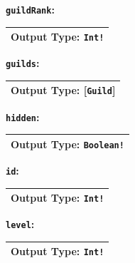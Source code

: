 \documentclass[10pt, a4paper]{memoir}
\numberwithin{equation}{section}
\theoremstyle{plain}
\theoremstyle{defp}
\theoremstyle{dotless}
\theoremstyle{definition}
\theoremstyle{dotless}
\theoremstyle{dotless}
\theoremstyle{defp}
\theoremstyle{defp}
\theoremstyle{be}          %
\theoremstyle{defp}
\newcommand\ttt[1]{\texttt{#1}}
\begin{document}
\medskip

\textbf{\ttt{guildRank}:}

\begin{table}[h]
	\centering
	\begin{tabular}{ |p{3cm}|p{3cm}|p{3cm}|  }
		\hline
		\multicolumn{3}{|c|}{Output Type: \ttt{Int!}} \\
		\hline
	\end{tabular}
\end{table}

\medskip

\textbf{\ttt{guilds}:}

\begin{table}[h!]
	\centering
	\begin{tabular}{ |p{3cm}|p{3cm}|p{3cm}|  }
		\hline
		\multicolumn{3}{|c|}{Output Type: [\ttt{Guild}]} \\
		\hline
	\end{tabular}
\end{table}

\medskip

\textbf{\ttt{hidden}:}

\begin{table}[h!]
	\centering
	\begin{tabular}{ |p{3cm}|p{3cm}|p{3cm}|  }
		\hline
		\multicolumn{3}{|c|}{Output Type: \ttt{Boolean!}} \\
		\hline
	\end{tabular}
\end{table}

\medskip

\textbf{\ttt{id}:}

\begin{table}[h!]
	\centering
	\begin{tabular}{ |p{3cm}|p{3cm}|p{3cm}|  }
		\hline
		\multicolumn{3}{|c|}{Output Type: \ttt{Int!}} \\
		\hline
	\end{tabular}
\end{table}

\newpage

\textbf{\ttt{level}:}

\begin{table}[h!]
	\centering
	\begin{tabular}{ |p{3cm}|p{3cm}|p{3cm}|  }
		\hline
		\multicolumn{3}{|c|}{Output Type: \ttt{Int!}} \\
		\hline
	\end{tabular}
\end{table}
\end{document}
